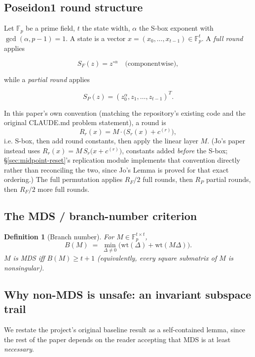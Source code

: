 \documentclass[11pt]{article}
\newtheorem{definition}{Definition}
\newcommand{\Fp}{\mathbb{F}_p}
\begin{document}
\subsection{Poseidon1 round structure}

Let $\Fp$ be a prime field, $t$ the state width, $\alpha$ the S-box
exponent with $\gcd(\alpha, p-1) = 1$. A state is a vector
$x = (x_0,\dots,x_{t-1}) \in \Fp^t$. A \emph{full round} applies

\[
  S_F(z) = z^{\circ \alpha} \quad\text{(componentwise)},
\]

while a \emph{partial round} applies

\[
  S_P(z) = (z_0^{\alpha}, z_1, \dots, z_{t-1})^{T}.
\]

In this paper's own convention (matching the repository's existing code
and the original CLAUDE.md problem statement), a round is
\[
  R_r(x) = M \cdot \big(S_r(x) + c^{(r)}\big),
\]
i.e. S-box, then add round constants, then apply the linear layer $M$.
(Jo's paper~\cite{jo2026} instead uses $R_r(x) = M\, S_r\big(x + c^{(r)}\big)$,
constants added \emph{before} the S-box; \S\ref{sec:midpoint-reset}'s
replication module implements that convention directly rather than
reconciling the two, since Jo's Lemma is proved for that exact ordering.)
The full permutation applies $R_F/2$ full rounds, then $R_P$ partial
rounds, then $R_F/2$ more full rounds.

\subsection{The MDS / branch-number criterion}

\begin{definition}[Branch number]
For $M \in \Fp^{t\times t}$,
\[
  B(M) \;=\; \min_{\Delta \neq 0} \big(\mathrm{wt}(\Delta) + \mathrm{wt}(M\Delta)\big).
\]
$M$ is \emph{MDS} iff $B(M) \geq t+1$ (equivalently, every square
submatrix of $M$ is nonsingular).
\end{definition}

\subsection{Why non-MDS is unsafe: an invariant subspace trail}
\label{sec:invariant-subspace}

We restate the project's original baseline result as a self-contained
lemma, since the rest of the paper depends on the reader accepting that
MDS is at least \emph{necessary}.
\end{document}
